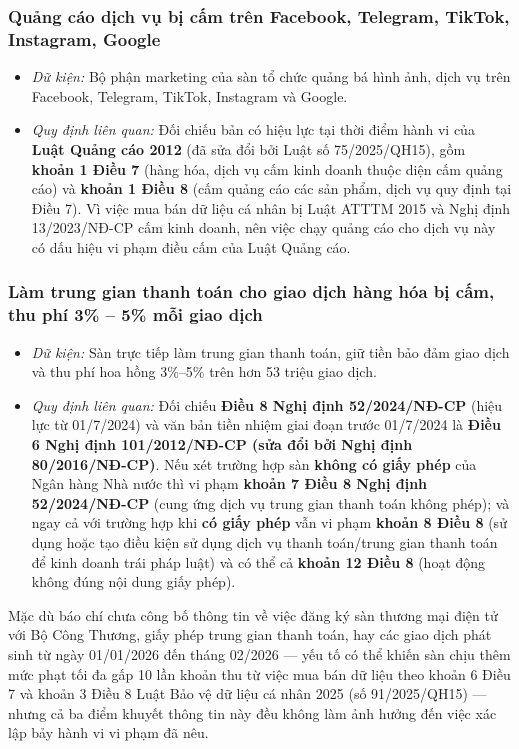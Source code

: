 \subsubsection{Quảng cáo dịch vụ bị cấm trên Facebook, Telegram, TikTok, Instagram, Google}\label{sec:3.2.3}

\begin{itemize}
\item \textit{Dữ kiện:} Bộ phận marketing của sàn tổ chức quảng bá hình ảnh, dịch vụ trên Facebook, Telegram, TikTok, Instagram và Google.
\item \textit{Quy định liên quan:} Đối chiếu bản có hiệu lực tại thời điểm hành vi của \textbf{Luật Quảng cáo 2012} (đã sửa đổi bởi Luật số 75/2025/QH15), gồm \textbf{khoản 1 Điều 7} (hàng hóa, dịch vụ cấm kinh doanh thuộc diện cấm quảng cáo) và \textbf{khoản 1 Điều 8} (cấm quảng cáo các sản phẩm, dịch vụ quy định tại Điều 7). Vì việc mua bán dữ liệu cá nhân bị Luật ATTTM 2015 và Nghị định 13/2023/NĐ-CP cấm kinh doanh, nên việc chạy quảng cáo cho dịch vụ này có dấu hiệu vi phạm điều cấm của Luật Quảng cáo.
\end{itemize}
\subsubsection{Làm trung gian thanh toán cho giao dịch hàng hóa bị cấm, thu phí 3\% – 5\% mỗi giao dịch}\label{sec:3.2.4}

\begin{itemize}
\item \textit{Dữ kiện:} Sàn trực tiếp làm trung gian thanh toán, giữ tiền bảo đảm giao dịch và thu phí hoa hồng 3\%–5\% trên hơn 53 triệu giao dịch.
\item \textit{Quy định liên quan:} Đối chiếu \textbf{Điều 8 Nghị định 52/2024/NĐ-CP} (hiệu lực từ 01/7/2024) và văn bản tiền nhiệm giai đoạn trước 01/7/2024 là \textbf{Điều 6 Nghị định 101/2012/NĐ-CP (sửa đổi bởi Nghị định 80/2016/NĐ-CP)}. Nếu xét trường hợp sàn \textbf{không có giấy phép} của Ngân hàng Nhà nước thì vi phạm \textbf{khoản 7 Điều 8 Nghị định 52/2024/NĐ-CP} (cung ứng dịch vụ trung gian thanh toán không phép); và ngay cả với trường hợp khi \textbf{có giấy phép} vẫn vi phạm \textbf{khoản 8 Điều 8} (sử dụng hoặc tạo điều kiện sử dụng dịch vụ thanh toán/trung gian thanh toán để kinh doanh trái pháp luật) và có thể cả \textbf{khoản 12 Điều 8} (hoạt động không đúng nội dung giấy phép).
\end{itemize}
Mặc dù báo chí chưa công bố thông tin về việc đăng ký sàn thương mại điện tử với Bộ Công Thương, giấy phép trung gian thanh toán, hay các giao dịch phát sinh từ ngày 01/01/2026 đến tháng 02/2026 — yếu tố có thể khiến sàn chịu thêm mức phạt tối đa gấp 10 lần khoản thu từ việc mua bán dữ liệu theo khoản 6 Điều 7 và khoản 3 Điều 8 Luật Bảo vệ dữ liệu cá nhân 2025 (số 91/2025/QH15) — nhưng cả ba điểm khuyết thông tin này đều không làm ảnh hưởng đến việc xác lập bảy hành vi vi phạm đã nêu.

